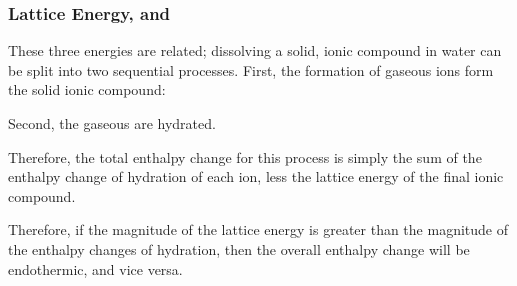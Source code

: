 

			\subsubsection{Lattice Energy,  and }

				These three energies are related; dissolving a solid, ionic compound in water can be split into two sequential processes.
				First, the formation of gaseous ions form the solid ionic compound:


				Second, the gaseous are hydrated.


				Therefore, the total enthalpy change for this process is simply the sum of the enthalpy change of hydration of each ion, less
				the lattice energy of the final ionic compound.


				Therefore, if the magnitude of the lattice energy is greater than the magnitude of the enthalpy changes of hydration, then the
				overall enthalpy change will be endothermic, and vice versa.





